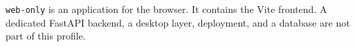 \begin{beginnerstatement}

\texttt{web-only} is an application for the browser. It contains the Vite
frontend. A dedicated FastAPI backend, a desktop layer, deployment, and a
database are not part of this profile.

\end{beginnerstatement}
